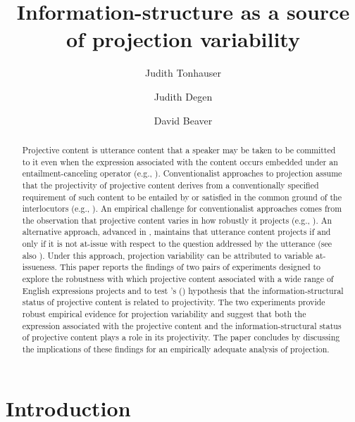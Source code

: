 \documentclass[11pt,fleqn]{article}
\title{Information-structure as a source of projection variability}
\author[$\bullet$]{Judith Tonhauser}
\author[$\triangleright$]{Judith Degen}
\author[$\circ$]{David Beaver}
\affil[$\bullet$]{The Ohio State University}
\affil[$\triangleright$]{Stanford University}
\affil[$\circ$]{University of Texas at Austin}
\newcommand{\6}{\mbox{$[\hspace*{-.6mm}[$}}
\newcommand{\9}{\mbox{$]\hspace*{-.6mm}]$}}
\newcommand{\citetpos}[1]{\citeauthor{#1}'s (\citeyear{#1})}
\begin{document}
\maketitle

\begin{abstract}
Projective content is utterance content that a speaker may be taken to be committed to it even when the expression associated with the content occurs embedded under an entailment-canceling operator (e.g., \citealt{ccmg90}). Conventionalist approaches to projection assume that the projectivity of projective content derives from a conventionally specified requirement of such content to be entailed by or satisfied in the common ground of the interlocutors (e.g., \citealt{heim83,vds92}). An empirical challenge for conventionalist approaches comes from the observation that projective content varies in how robustly it projects (e.g., \citealt{karttunen71b,simons01,abusch10}). An alternative approach, advanced in \citealt{brst-salt10}, maintains that utterance content projects if and only if it is not at-issue with respect to the question addressed by the utterance (see also \citealt{brst-ar}). Under this approach, projection variability can be attributed to variable at-issueness. This paper reports the findings of two pairs of experiments designed to explore the robustness with which projective content associated with a wide range of English expressions projects and to test \citetpos{brst-salt10} hypothesis that the information-structural status of projective content is related to projectivity. The two experiments provide robust empirical evidence for projection variability and suggest that both the expression associated with the projective content and the information-structural status of projective content plays a role in its projectivity. The paper concludes by discussing the implications of these findings for an empirically adequate analysis of projection.

\end{abstract}


			
\section{Introduction}\label{s1}
\end{document}
